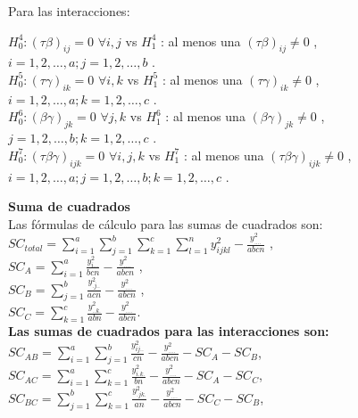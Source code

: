 Para las interacciones:
\begin{center}
	$H^{4}_{0} : (\tau \beta)_{ij} = 0$ $ \forall i,j$ vs $H^{4}_{1}$ : al menos una $(\tau \beta)_{ij} \neq 0$ , $i = 1,2, \dots, a; j = 1,2, \dots,b$ .\\
	$H^{5}_{0} : (\tau \gamma)_{ik} = 0$ $ \forall i,k$ vs $H^{5}_{1}$ : al menos una $(\tau \gamma)_{ik} \neq 0$ , $i = 1,2, \dots, a; k = 1,2, \dots,c$ .\\
	$H^{6}_{0} : (\beta \gamma)_{jk} = 0$ $ \forall j,k$ vs $H^{6}_{1}$ : al menos una $(\beta \gamma)_{jk} \neq 0$ , $j = 1,2, \dots, b; k = 1,2, \dots, c$ .\\
	$H^{7}_{0} : (\tau \beta \gamma)_{ijk} = 0$ $ \forall i,j,k$ vs $H^{7}_{1}$ : al menos una $(\tau \beta \gamma)_{ijk} \neq 0$ , $i = 1,2, \dots, a; j = 1,2, \dots, b; k = 1,2, \dots, c$ .\\
\end{center}

\textbf{Suma de cuadrados}\\

Las fórmulas de cálculo para las sumas de cuadrados son:\\
{\large$ SC_{total} = \sum_{i=1}^{a}  \sum_{j=1}^{b}  \sum_{k=1}^{c}  \sum_{l=1}^{n} y_{ijkl}^{2} - \frac{y_{....}^{2}}{abcn} $} ,\\

{\large $ SC_{A} = \sum_{i=1}^{a} \frac{y_{i...}^{2}}{bcn}  - \frac{y_{....}^{2}}{abcn} $} ,\\

{\large$ SC_{B} = \sum_{j=1}^{b} \frac{y_{.j..}^{2}}{acn}  - \frac{y_{....}^{2}}{abcn} $}  ,\\

{\large$ SC_{C} = \sum_{k=1}^{c} \frac{y_{..k.}^{2}}{abn} - \frac{y_{....}^{2}}{abcn} $}.\\


\textbf{Las sumas de cuadrados para las interacciones son:}\\

{\large$ SC_{AB} = \sum_{i=1}^{a} \sum_{j=1}^{b}  \frac{y_{ij..}^{2}}{cn}  - \frac{y_{....}^{2}}{abcn} - SC_{A} -SC_{B} $}, \\

{\large$ SC_{AC} = \sum_{i=1}^{a} \sum_{k=1}^{c}  \frac{y_{i.k.}^{2}}{bn}  - \frac{y_{....}^{2}}{abcn} - SC_{A} -SC_{C} $}, \\

{\large$ SC_{BC} = \sum_{j=1}^{b} \sum_{k=1}^{c}  \frac{y_{.jk.}^{2}}{an}  - \frac{y_{....}^{2}}{abcn} - SC_{C} -SC_{B} $}, \\


